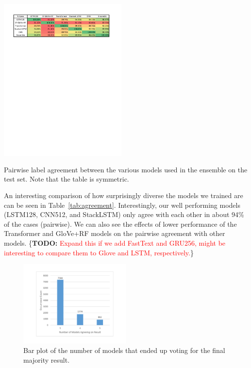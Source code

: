 \documentclass[10pt,conference,compsocconf]{IEEEtran}
\newcommand{\TODO}[1]{\{\textbf{TODO: }\textcolor{red}{#1}\}}
\begin{document}
\begin{table}\centering
\includegraphics[width=0.48\textwidth]{./ensemble_tablev2}
\caption{Pairwise label agreement between the various models used in the ensemble on the test set. Note that the table is symmetric.}\label{tab:agreement}
\end{table}



An interesting comparison of how surprisingly diverse the models we trained are 
can be seen in Table~\ref{tab:agreement}. Interestingly, our well  performing models (LSTM128, CNN512, and StackLSTM) only agree with each other in about 94\% of the cases (pairwise).
We can also see the effects of lower performance of the Transformer and GloVe+RF models on the pairwise agreement with other models. 
\TODO{Expand this if we add FastText and GRU256, might be interesting to compare them to Glove and LSTM, respectively.}

\begin{figure}\centering
\includegraphics[width=0.5\textwidth]{./ensemble_diag}
\caption{Bar plot of the number of models that ended up voting for the final majority result.}\label{fig:diag}
\end{figure}
\end{document}
